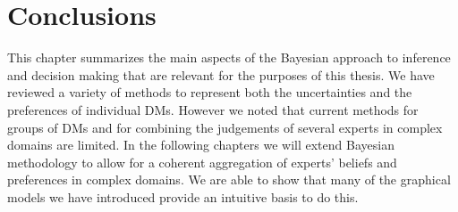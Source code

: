 \section{Conclusions}
This chapter summarizes the main aspects of the Bayesian approach to inference and decision making that are relevant for the purposes of this thesis. We have reviewed a variety of methods to represent both the uncertainties and the preferences of individual \glspl{DM}. However we noted that current methods for groups of \glspl{DM} and for combining the judgements of several experts in complex domains are limited. In the following chapters we will extend  Bayesian methodology to allow for a coherent aggregation of experts' beliefs and preferences in complex domains. We are able to show that many of the graphical models we have introduced provide an intuitive basis to do this. 
